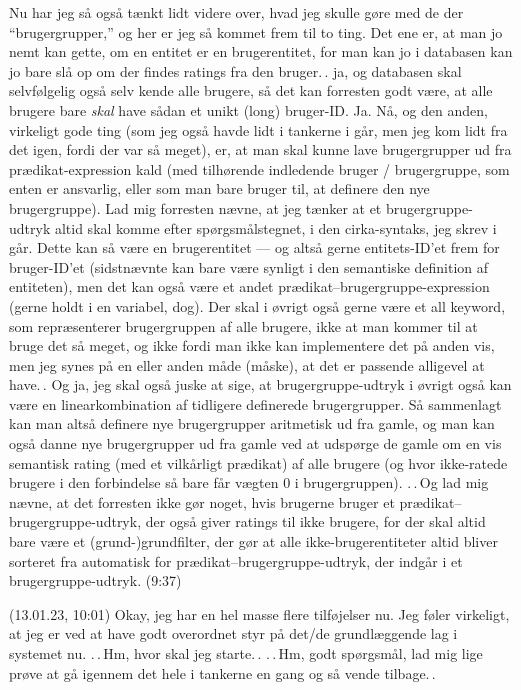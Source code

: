 \documentclass{report}
\begin{document}
Nu har jeg så også tænkt lidt videre over, hvad jeg skulle gøre med de der ``brugergrupper,'' og her er jeg så kommet frem til to ting. Det ene er, at man jo nemt kan gette, om en entitet er en brugerentitet, for man kan jo i databasen kan jo bare slå op om der findes ratings fra den bruger.\,. ja, og databasen skal selvfølgelig også selv kende alle brugere, så det kan forresten godt være, at alle brugere bare \emph{skal} have sådan et unikt (long) bruger-ID. Ja. Nå, og den anden, virkeligt gode ting (som jeg også havde lidt i tankerne i går, men jeg kom lidt fra det igen, fordi der var så meget), er, at man skal kunne lave brugergrupper ud fra prædikat-expression kald (med tilhørende indledende bruger / brugergruppe, som enten er ansvarlig, eller som man bare bruger til, at definere den nye brugergruppe). Lad mig forresten nævne, at jeg tænker at et brugergruppe-udtryk altid skal komme efter spørgsmålstegnet, i den cirka-syntaks, jeg skrev i går. Dette kan så være en brugerentitet --- og altså gerne entitets-ID'et frem for bruger-ID'et (sidstnævnte kan bare være synligt i den semantiske definition af entiteten), men det kan også være et andet prædikat--brugergruppe-expression (gerne holdt i en variabel, dog). Der skal i øvrigt også gerne være et all keyword, som repræsenterer brugergruppen af alle brugere, ikke at man kommer til at bruge det så meget, og ikke fordi man ikke kan implementere det på anden vis, men jeg synes på en eller anden måde (måske), at det er passende alligevel at have.\,. %
Og ja, jeg skal også juske at sige, at brugergruppe-udtryk i øvrigt også kan være en linearkombination af tidligere definerede brugergrupper. Så sammenlagt kan man altså definere nye brugergrupper aritmetisk ud fra gamle, og man kan også danne nye brugergrupper ud fra gamle ved at udspørge de gamle om en vis semantisk rating (med et vilkårligt prædikat) af alle brugere (og hvor ikke-ratede brugere i den forbindelse så bare får vægten 0 i brugergruppen). .\,.\,Og lad mig nævne, at det forresten ikke gør noget, hvis brugerne bruger et prædikat--brugergruppe-udtryk, der også giver ratings til ikke brugere, for der skal altid bare være et (grund-)grundfilter, der gør at alle ikke-brugerentiteter altid bliver sorteret fra automatisk for prædikat--brugergruppe-udtryk, der indgår i et brugergruppe-udtryk. (9:37)


(13.01.23, 10:01) Okay, jeg har en hel masse flere tilføjelser nu. Jeg føler virkeligt, at jeg er ved at have godt overordnet styr på det/de grundlæggende lag i systemet nu. .\,.\,Hm, hvor skal jeg starte.\,. .\,.\,Hm, godt spørgsmål, lad mig lige prøve at gå igennem det hele i tankerne en gang og så vende tilbage.\,. 
\end{document}
